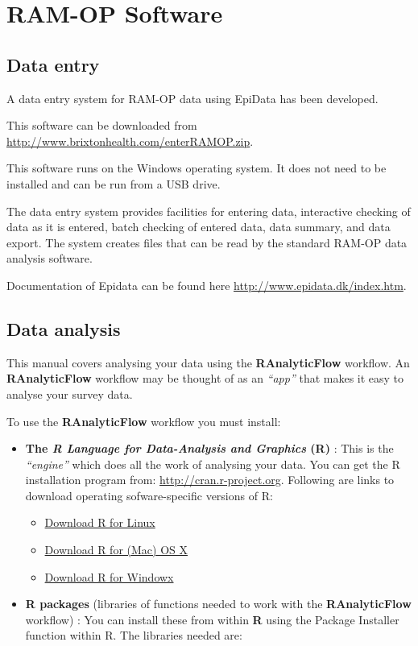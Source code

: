 \documentclass[12pt,a4paper]{book}
\theoremstyle{definition}
\theoremstyle{definition}
\theoremstyle{definition}
\theoremstyle{remark}
\begin{document}
\hypertarget{software}{%
\chapter{RAM-OP Software}\label{software}}

\hypertarget{data-entry}{%
\section{Data entry}\label{data-entry}}

A data entry system for RAM-OP data using EpiData has been developed.

This software can be downloaded from
\url{http://www.brixtonhealth.com/enterRAMOP.zip}.

This software runs on the Windows operating system. It does not need to
be installed and can be run from a USB drive.

The data entry system provides facilities for entering data, interactive
checking of data as it is entered, batch checking of entered data, data
summary, and data export. The system creates files that can be read by
the standard RAM-OP data analysis software.

Documentation of Epidata can be found here
\url{http://www.epidata.dk/index.htm}.

\hypertarget{data-analysis}{%
\section{Data analysis}\label{data-analysis}}

This manual covers analysing your data using the \textbf{RAnalyticFlow}
workflow. An \textbf{RAnalyticFlow} workflow may be thought of as an
\emph{``app''} that makes it easy to analyse your survey data.

To use the \textbf{RAnalyticFlow} workflow you must install:

\begin{itemize}
\item
  \textbf{The \emph{R Language for Data-Analysis and Graphics} (R)} :
  This is the \emph{``engine''} which does all the work of analysing
  your data. You can get the R installation program from:
  \url{http://cran.r-project.org}. Following are links to download
  operating sofware-specific versions of R:

  \begin{itemize}
  \item
    \href{https://cran.r-project.org/bin/linux/}{Download R for Linux}
  \item
    \href{https://cran.r-project.org/bin/macosx/}{Download R for (Mac)
    OS X}
  \item
    \href{https://cran.r-project.org/bin/windows/}{Download R for
    Windowx}
  \end{itemize}
\item
  \textbf{R packages} (libraries of functions needed to work with the
  \textbf{RAnalyticFlow} workflow) : You can install these from within
  \textbf{R} using the Package Installer function within R. The
  libraries needed are:
\end{itemize}
\end{document}
